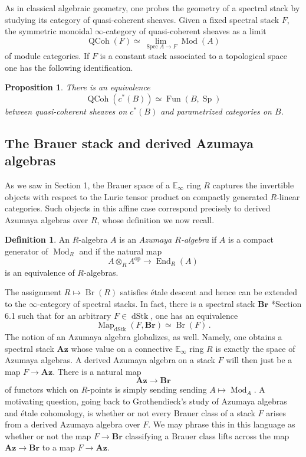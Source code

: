 \documentclass[10pt]{amsart}
\theoremstyle{plain}
\newtheorem{proposition}[theorem]{Proposition}
\theoremstyle{definition}
\newtheorem{definition}[theorem]{Definition}
\DeclareMathOperator{\Mod}{Mod}
\DeclareMathOperator{\QCoh}{QCoh}
\DeclareMathOperator{\End}{End}
\DeclareMathOperator{\Sp}{Sp}
\DeclareMathOperator{\Fun}{Fun}
\DeclareMathOperator{\Br}{Br}
\def\on{\operatorname}
\DeclareMathOperator{\Map}{Map}
\newcommand{\bE}{\mathbb{E}}
\begin{document}
As in classical algebraic geometry, one probes the geometry of a spectral stack by studying its category of quasi-coherent sheaves. Given a fixed spectral stack $F$, the symmetric monoidal $\infty$-category of quasi-coherent sheaves as a limit
$$
\QCoh(F) \simeq \lim_{\on{Spec} A \to F} \Mod(A)
$$
of module categories. If $F$ is a constant stack associated to a topological space one has the following identification.

\begin{proposition}
    There is an equivalence
    $$
    \QCoh(c^*(B))\simeq \Fun(B, \Sp)
    $$
between quasi-coherent sheaves on $c^*(B)$ and parametrized categories on $B$.
\end{proposition}

\subsection{The Brauer stack and derived Azumaya algebras}

As we saw in Section 1, the Brauer space of a $\bE_\infty$ ring $R$ captures the invertible objects with respect to the Lurie tensor product on compactly generated $R$-linear categories.
Such objects in this affine case correspond precisely to derived Azumaya algebras over $R$, whose definition we now recall.

\begin{definition}
   An $R$-algebra $A$ is an \emph{Azumaya $R$-algebra} if $A$ is a compact generator of $\Mod_R$ and if the natural map
   $$
   A \otimes_R A^{\on{op}} \to \End_{R}(A)
   $$
   is an equivalence of $R$-algebras.
\end{definition}

The assignment $R \mapsto \Br(R)$ satisfies \'{e}tale descent and hence can be extended to the $\infty$-category of spectral stacks.
In fact, there is a spectral stack $\mathbf{Br}$ \cite{AG14}*{Section 6.1} such that for an arbitrary $F \in \on{dStk}$, one has an equivalence
$$
\Map_{\on{dStk}}(F, \mathbf{Br}) \simeq \Br(F) \,.
$$
The notion of an Azumaya algebra globalizes, as well. Namely, one obtains a spectral stack $\mathbf{Az}$ whose value on a connective $\bE_\infty$ ring $R$ is exactly the space of Azumaya algebras. A derived Azumaya algebra on a stack $F$ will then just be a map $F \to \mathbf{Az}$. There is a natural map
$$
\mathbf{Az} \to \mathbf{Br}
$$
of functors which on $R$-points is simply sending sending $A \mapsto \Mod_A$.
A motivating question, going back to Grothendieck's study of Azumaya algebras and \'{e}tale cohomology, is whether or not every Brauer class of a stack $F$ arises from a derived Azumaya algebra over $F$.
We may phrase this in this language as whether or not the map $F \to \mathbf{Br}$ classifying a Brauer class lifts across the map $\mathbf{Az} \to \mathbf{Br}$ to a map $F \to \mathbf{Az}$.
\end{document}
